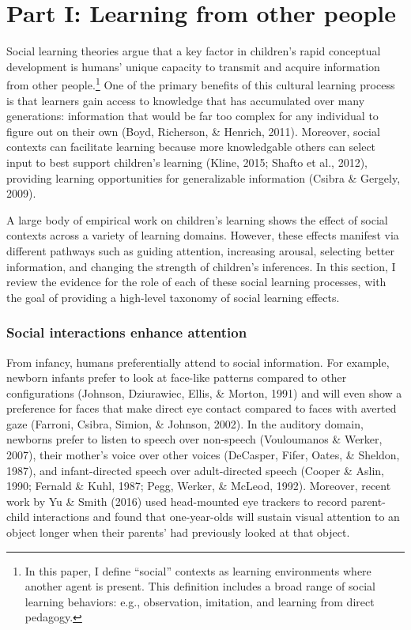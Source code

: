 \documentclass[a4paper,man,apacite,floatsintext]{apa6}
\begin{document}
\section{Part I: Learning from other
people}\label{part-i-learning-from-other-people}

Social learning theories argue that a key factor in children's rapid
conceptual development is humans' unique capacity to transmit and
acquire information from other people.\footnote{In this paper, I define
  ``social'' contexts as learning environments where another agent is
  present. This definition includes a broad range of social learning
  behaviors: e.g., observation, imitation, and learning from direct
  pedagogy.} One of the primary benefits of this cultural learning
process is that learners gain access to knowledge that has accumulated
over many generations: information that would be far too complex for any
individual to figure out on their own (Boyd, Richerson, \& Henrich,
2011). Moreover, social contexts can facilitate learning because more
knowledgable others can select input to best support children's learning
(Kline, 2015; Shafto et al., 2012), providing learning opportunities for
generalizable information (Csibra \& Gergely, 2009).

A large body of empirical work on children's learning shows the effect
of social contexts across a variety of learning domains. However, these
effects manifest via different pathways such as guiding attention,
increasing arousal, selecting better information, and changing the
strength of children's inferences. In this section, I review the
evidence for the role of each of these social learning processes, with
the goal of providing a high-level taxonomy of social learning effects.

\subsubsection{Social interactions enhance
attention}\label{social-interactions-enhance-attention}

From infancy, humans preferentially attend to social information. For
example, newborn infants prefer to look at face-like patterns compared
to other configurations (Johnson, Dziurawiec, Ellis, \& Morton, 1991)
and will even show a preference for faces that make direct eye contact
compared to faces with averted gaze (Farroni, Csibra, Simion, \&
Johnson, 2002). In the auditory domain, newborns prefer to listen to
speech over non-speech (Vouloumanos \& Werker, 2007), their mother's
voice over other voices (DeCasper, Fifer, Oates, \& Sheldon, 1987), and
infant-directed speech over adult-directed speech (Cooper \& Aslin,
1990; Fernald \& Kuhl, 1987; Pegg, Werker, \& McLeod, 1992). Moreover,
recent work by Yu \& Smith (2016) used head-mounted eye trackers to
record parent-child interactions and found that one-year-olds will
sustain visual attention to an object longer when their parents' had
previously looked at that object.
\end{document}

